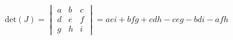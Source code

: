 \documentclass[preview]{standalone}
\begin{document}
$\displaystyle
  \mathrm{det}(J) = 
  \begin{vmatrix}
    a & b & c \\
    d & e & f \\
    g & h & i
  \end{vmatrix} =
  aei+bfg+cdh-ceg-bdi-afh   
$
\end{document}
